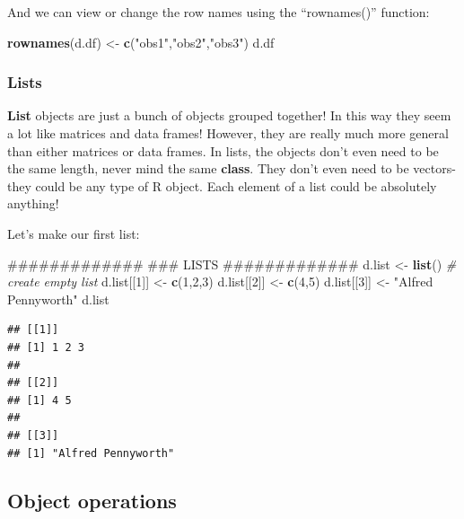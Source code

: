 \documentclass[]{article}
\newenvironment{Shaded}{\begin{snugshade}}{\end{snugshade}}
\newcommand{\KeywordTok}[1]{\textcolor[rgb]{0.13,0.29,0.53}{\textbf{#1}}}
\newcommand{\DecValTok}[1]{\textcolor[rgb]{0.00,0.00,0.81}{#1}}
\newcommand{\StringTok}[1]{\textcolor[rgb]{0.31,0.60,0.02}{#1}}
\newcommand{\CommentTok}[1]{\textcolor[rgb]{0.56,0.35,0.01}{\textit{#1}}}
\newcommand{\NormalTok}[1]{#1}
\begin{document}
And we can view or change the row names using the ``rownames()''
function:

\begin{Shaded}
\begin{Highlighting}[]
\KeywordTok{rownames}\NormalTok{(d.df) <-}\StringTok{ }\KeywordTok{c}\NormalTok{(}\StringTok{"obs1"}\NormalTok{,}\StringTok{"obs2"}\NormalTok{,}\StringTok{"obs3"}\NormalTok{)}
\NormalTok{d.df}
\end{Highlighting}
\end{Shaded}

\subsubsection{Lists}\label{lists}

\textbf{List} objects are just a bunch of objects grouped together! In
this way they seem a lot like matrices and data frames! However, they
are really much more general than either matrices or data frames. In
lists, the objects don't even need to be the same length, never mind the
same \textbf{class}. They don't even need to be vectors- they could be
any type of R object. Each element of a list could be absolutely
anything!

Let's make our first list:

\begin{Shaded}
\begin{Highlighting}[]
\NormalTok{#############}
\NormalTok{### LISTS}
\NormalTok{#############}
\NormalTok{d.list <-}\StringTok{ }\KeywordTok{list}\NormalTok{()        }\CommentTok{# create empty list}
\NormalTok{d.list[[}\DecValTok{1}\NormalTok{]] <-}\StringTok{ }\KeywordTok{c}\NormalTok{(}\DecValTok{1}\NormalTok{,}\DecValTok{2}\NormalTok{,}\DecValTok{3}\NormalTok{)}
\NormalTok{d.list[[}\DecValTok{2}\NormalTok{]] <-}\StringTok{ }\KeywordTok{c}\NormalTok{(}\DecValTok{4}\NormalTok{,}\DecValTok{5}\NormalTok{)}
\NormalTok{d.list[[}\DecValTok{3}\NormalTok{]] <-}\StringTok{ "Alfred Pennyworth"}
\NormalTok{d.list}
\end{Highlighting}
\end{Shaded}

\begin{verbatim}
## [[1]]
## [1] 1 2 3
## 
## [[2]]
## [1] 4 5
## 
## [[3]]
## [1] "Alfred Pennyworth"
\end{verbatim}

\subsection{Object operations}\label{object-operations}
\end{document}
